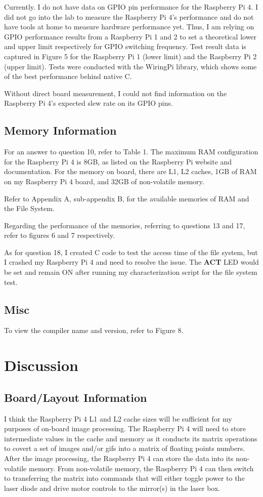 \documentclass[journal]{IEEEtran}
\begin{document}
    Currently. I do not have data on GPIO pin performance for the Raspberry Pi 4. 
    I did not go into the lab to measure the Raspberry Pi 4's performance and do not have tools at home to measure hardware performance yet.
    Thus, I am relying on GPIO performance results from a Raspberry Pi 1 and 2 to set a theoretical lower and upper limit respectively for GPIO switching frequency. 
    Test result data is captured in Figure 5 for the Raspberry Pi 1 (lower limit) and the Raspberry Pi 2 (upper limit).
    Tests were conducted with the WiringPi library, which shows some of the best performance behind native C.

    Without direct board measurement, I could not find information on the Raspberry Pi 4's expected slew rate on its GPIO pins.

    \subsection{Memory Information}
    For an answer to question 10, refer to Table 1.
    The maximum RAM configuration for the Raspberry Pi 4 is 8GB, as listed on the Raspberry Pi website and documentation.
    For the memory on board, there are L1, L2 caches, 1GB of RAM on my Raspberry Pi 4 board, and 32GB of non-volatile memory.

    Refer to Appendix A, sub-appendix B, for the available memories of RAM and the File System.

    Regarding the performance of the memories, referring to questions 13 and 17, refer to figures 6 and 7 respectively.

    As for question 18, I created C code to test the access time of the file system, but I crashed my Raspberry Pi 4 and need to resolve the issue.
    The \textbf{ACT} LED would be set and remain ON after running my characterization script for the file system test.

    \subsection{Misc}
    To view the compiler name and version, refer to Figure 8.

    \section{Discussion}
    \subsection{Board/Layout Information}
    I think the Raspberry Pi 4 L1 and L2 cache sizes will be sufficient for my purposes of on-board image processing. 
    The Raspberry Pi 4 will need to store intermediate values in the cache and memory as it conducts its matrix operations to covert a set of images and/or gifs into a matrix of floating points numbers.
    After the image processing, the Raspberry Pi 4 can store the data into its non-volatile memory.
    From non-volatile memory, the Raspberry Pi 4 can then switch to transferring the matrix into commands that will either toggle power to the laser diode and drive motor controls to the mirror(s) in the laser box. 
    
\end{document}
